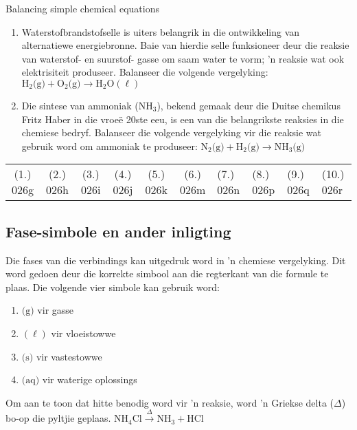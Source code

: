 \begin{exercises}{Balancing simple chemical equations}
{\begin{enumerate}[noitemsep, label=\textbf{\arabic*}. ]
\item Waterstofbrandstofselle is uiters belangrik in die ontwikkeling van alternatiewe energiebronne. Baie van hierdie selle funksioneer deur die reaksie van waterstof- en suurstof- gasse om saam water te vorm;  'n reaksie wat ook elektrisiteit produseer. Balanseer die volgende vergelyking: ${\text{H}_{2} \text{(g)} + {\text{O}}_{2} \text{(g)} \to {\text{H}}_{2} \text{O} (\ell)}$

\item Die sintese van ammoniak ($\text{NH}_{3}$), bekend gemaak deur die Duitse chemikus Fritz Haber in die vroe\"{e} 20ste eeu, is een van die belangrikste reaksies in die chemiese bedryf. Balanseer die volgende vergelyking vir die reaksie wat gebruik word om ammoniak te produseer:
$\text{N}_{2} \text{(g)} + \text{H}_{2} \text{(g)} \to {\text{NH}}_{3} \text{(g)}$
\end{enumerate}

\practiceinfo
\begin{tabular}[h]{cccccc}
 (1.) 026g  &  (2.) 026h   &  (3.) 026i  &  (4.) 026j  &  (5.) 026k  &  (6.) 026m  &  (7.) 026n  &  (8.) 026p  &  (9.) 026q  &  (10.) 026r  &
\end{tabular}
}
\end{exercises}

         \subsection*{Fase-simbole en ander inligting}
    \nopagebreak

Die fases van die verbindings kan uitgedruk word in  'n chemiese vergelyking. Dit word gedoen deur die korrekte simbool aan die regterkant van die formule te plaas. Die volgende vier simbole kan gebruik word: 
      \label{m38727*id65925}\begin{enumerate}[noitemsep, label=\textbf{\arabic*}. ] 
            \label{m38727*uid27}\item $\text{(g)}$ vir gasse
\label{m38727*uid28}\item $(\ell)$ vir vloeistowwe
\label{m38727*uid29}\item $\text{(s)}$ vir  vastestowwe
\label{m38727*uid30}\item $\text{(aq)}$ vir waterige oplossings 
\end{enumerate}
Om aan te toon dat hitte benodig word vir 'n reaksie, word 'n Griekse delta ($\Delta $) bo-op die pyltjie geplaas.
$\text{NH}_{4}\text{Cl} \xrightarrow{\Delta} \text{NH}_{3} + \text{HCl}$ \\


